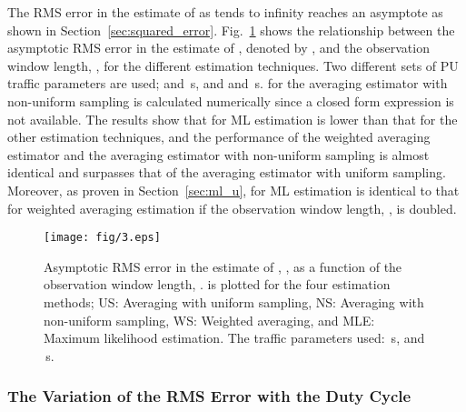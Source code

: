 \documentclass[11pt,draftclsnofoot,journal,onecolumn]{IEEEtran}
\begin{document}
The RMS error in the estimate of  as  tends to infinity reaches an asymptote as shown in Section~\ref{sec:squared_error}. Fig.~\ref{fig:asym_T} shows the relationship between the asymptotic RMS error in the estimate of , denoted by , and the observation window length, , for the different estimation techniques. Two different sets of PU traffic parameters are used;  and \,s, and  and \,s.  for the averaging estimator with non-uniform sampling is calculated numerically since a closed form expression is not available. The results show that  for ML estimation is lower than that for the other estimation techniques, and the performance of the weighted averaging estimator and the averaging estimator with non-uniform sampling is almost identical and surpasses that of the averaging estimator with uniform sampling. Moreover, as proven in Section~\ref{sec:ml_u},  for ML estimation is identical to that for weighted averaging estimation if the observation window length, , is doubled. 
\begin{figure}
\centering
\texttt{[image: fig/3.eps]}
\caption{Asymptotic RMS error in the estimate of , , as a function of the observation window length, .  is plotted for the four estimation methods; US: Averaging with uniform sampling, NS: Averaging with non-uniform sampling, WS: Weighted averaging, and MLE: Maximum likelihood estimation. The traffic parameters used: \,s, and \,s.}
\label{fig:asym_T}
\end{figure}

\subsubsection{The Variation of the RMS Error with the Duty Cycle}
\end{document}
